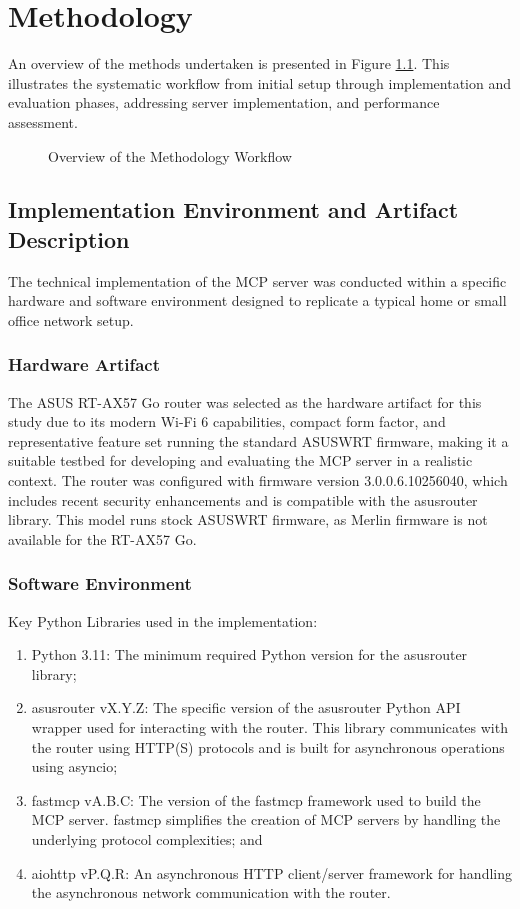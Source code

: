 \chapter{Methodology}
\label{chap:methodology}
An overview of the methods undertaken is presented in Figure \ref{fig:methodology-overview}. This illustrates the systematic workflow from initial setup through implementation and evaluation phases, addressing server implementation, and performance assessment.
\begin{figure}[h]
\centering
{}
\caption{Overview of the Methodology Workflow}
\label{fig:methodology-overview}
\end{figure}

\section{Implementation Environment and Artifact Description}
The technical implementation of the MCP server was conducted within a specific hardware and software environment designed to replicate a typical home or small office network setup.
\subsection{Hardware Artifact}
The ASUS RT-AX57 Go router was selected as the hardware artifact for this study due to its modern Wi-Fi 6 capabilities, compact form factor, and representative feature set running the standard ASUSWRT firmware, making it a suitable testbed for developing and evaluating the MCP server in a realistic context. The router was configured with firmware version 3.0.0.6.10256040, which includes recent security enhancements and is compatible with the asusrouter library. This model runs stock ASUSWRT firmware, as Merlin firmware is not available for the RT-AX57 Go.
\subsection{Software Environment}
Key Python Libraries used in the implementation:
\begin{enumerate}
\item Python 3.11: The minimum required Python version for the asusrouter library;
\item asusrouter vX.Y.Z: The specific version of the asusrouter Python API wrapper used for interacting with the router. This library communicates with the router using HTTP(S) protocols and is built for asynchronous operations using asyncio;
\item fastmcp vA.B.C: The version of the fastmcp framework used to build the MCP server. fastmcp simplifies the creation of MCP servers by handling the underlying protocol complexities; and
\item aiohttp vP.Q.R: An asynchronous HTTP client/server framework for handling the asynchronous network communication with the router.
\end{enumerate}
